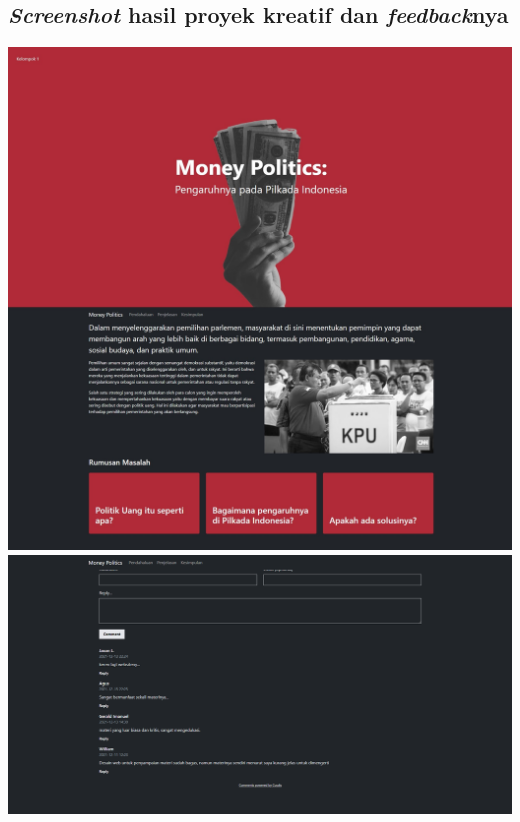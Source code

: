 \documentclass[12pt]{article}
\begin{document}
\subsection*{\emph{Screenshot} hasil proyek kreatif dan \emph{feedback}nya}
\begin{minipage}[c]{0.47\textwidth}
    \includegraphics[width=\textwidth,keepaspectratio]{Asset/website.jpg}
    \includegraphics[width=\textwidth,keepaspectratio]{Asset/feedback-web.png}
\end{minipage}
\end{document}

